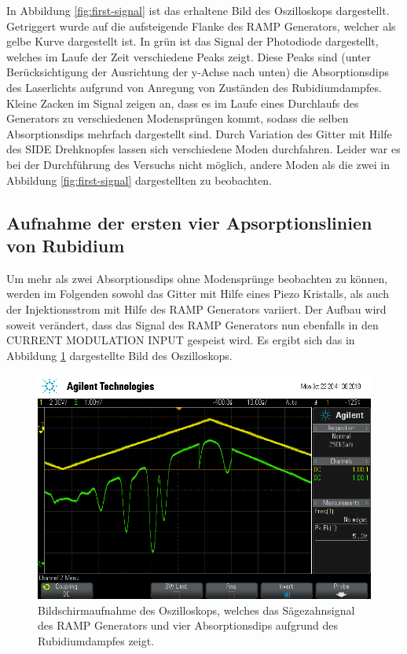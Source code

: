 In Abbildung \ref{fig:first-signal} ist das erhaltene Bild des Oszilloskops dargestellt.
Getriggert wurde auf die aufsteigende Flanke des RAMP Generators, welcher als gelbe
Kurve dargestellt ist. In grün ist das Signal der Photodiode dargestellt, welches
im Laufe der Zeit verschiedene Peaks zeigt. Diese Peaks sind (unter Berücksichtigung
der Ausrichtung der y-Achse nach unten) die Absorptionsdips des
Laserlichts aufgrund von Anregung von Zuständen des Rubidiumdampfes.
Kleine Zacken im Signal zeigen an, dass es im Laufe eines Durchlaufs des Generators
zu verschiedenen Modensprüngen kommt, sodass die selben Absorptionsdips mehrfach
dargestellt sind.
Durch Variation des Gitter mit Hilfe des SIDE Drehknopfes lassen sich verschiedene
Moden durchfahren. Leider war es bei der Durchführung des Versuchs nicht möglich,
andere Moden als die zwei in Abbildung \ref{fig:first-signal} dargestellten zu
beobachten.

\subsection{Aufnahme der ersten vier Apsorptionslinien von Rubidium}
\label{sec:AbsorptionImproved}

Um mehr als zwei Absorptionsdips ohne Modensprünge beobachten zu können, werden im Folgenden
sowohl das Gitter mit Hilfe eines Piezo Kristalls, als auch der Injektionsstrom
mit Hilfe des RAMP Generators variiert.
Der Aufbau wird soweit verändert, dass das Signal des RAMP Generators nun ebenfalls
in den CURRENT MODULATION INPUT gespeist wird.
Es ergibt sich das in Abbildung \ref{fig:second-signal} dargestellte Bild des
Oszilloskops.

\begin{figure}
	\centering
	\includegraphics[width=.8\textwidth]{images/second-signal.png}
	\caption{Bildschirmaufnahme des Oszilloskops, welches das Sägezahnsignal des
	RAMP Generators und vier Absorptionsdips aufgrund des Rubidiumdampfes zeigt.}
	\label{fig:second-signal}
\end{figure}


